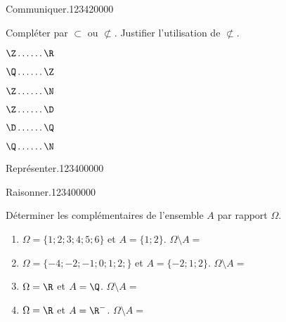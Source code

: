 \begin{pageAD} 
 





 
  
\begin{ExoCad}{Communiquer.}{1234}{2}{0}{0}{0}{0}

Compléter par $\subset$  ou $\not\subset$. Justifier l'utilisation de  $\not\subset$.

\begin{enumerate}
\begin{minipage}{0.49\linewidth}
\item $\Z \ldots \ldots \R$ 
\item $\Q \ldots \ldots \Z$ 
\item $\Z \ldots \ldots \N$ 
\end{minipage}
\hfill
\begin{minipage}{0.49\linewidth}
\item $\Z \ldots \ldots \D$ 
\item $\D \ldots \ldots \Q$ 
\item $\Q \ldots \ldots \N$ 
\end{minipage}
\end{enumerate}
 
\end{ExoCad}

\begin{ExoCad}{Représenter.}{1234}{0}{0}{0}{0}{0}

 
 
\end{ExoCad}




\begin{ExoCad}{Raisonner.}{1234}{0}{0}{0}{0}{0}

Déterminer les complémentaires de l'ensemble $A$ par rapport $\Omega$. 
\begin{enumerate}
\item $\Omega = \lbrace 1;2;3;4;5;6\rbrace$ et $A = \lbrace 1;2 \rbrace$. $\Omega \setminus A = $
\item $\Omega = \lbrace -4;-2;-1;0;1;2;\rbrace$ et $A = \lbrace -2;1;2 \rbrace$.  $\Omega \setminus A = $
\item $\Omega = \R$ et $A = \Q$. $\Omega \setminus A = $
\item $\Omega = \R$ et $A = \R^-$. $\Omega \setminus A = $
\end{enumerate} 
 \end{ExoCad}



\end{pageAD}
